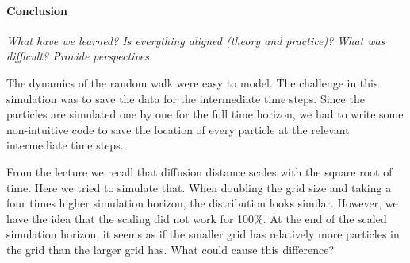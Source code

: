  \paragraph{Conclusion}
 \textit{What have we learned? Is everything aligned (theory and practice)? What was difficult? Provide perspectives.}
 
 The dynamics of the random walk were easy to model. The challenge in this simulation was to save the data for the intermediate time steps. Since the particles are simulated one by one for the full time horizon, we had to write some non-intuitive code to save the location of every particle at the relevant intermediate time steps. \newline
 
 From the lecture we recall that diffusion distance scales with the square root of time. Here we tried to simulate that. When doubling the grid size and taking a four times higher simulation horizon, the distribution looks similar. However, we have the idea that the scaling did not work for 100\%. At the end of the scaled simulation horizon, it seems as if the smaller grid has relatively more particles in the grid than the larger grid has. What could cause this difference?
 
